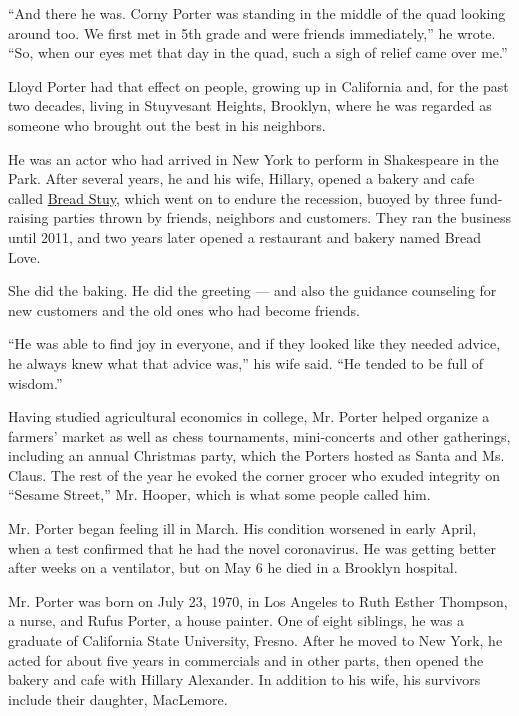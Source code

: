 ``And there he was. Corny Porter was standing in the middle of the quad
looking around too. We first met in 5th grade and were friends
immediately,'' he wrote. ``So, when our eyes met that day in the quad,
such a sigh of relief came over me.''

Lloyd Porter had that effect on people, growing up in California and,
for the past two decades, living in Stuyvesant Heights, Brooklyn, where
he was regarded as someone who brought out the best in his neighbors.

He was an actor who had arrived in New York to perform in Shakespeare in
the Park. After several years, he and his wife, Hillary, opened a bakery
and cafe called
\href{https://www.nytimes3xbfgragh.onion/2010/02/13/nyregion/13metjournal.html}{Bread
Stuy}, which went on to endure the recession, buoyed by three
fund-raising parties thrown by friends, neighbors and customers. They
ran the business until 2011, and two years later opened a restaurant and
bakery named Bread Love.

She did the baking. He did the greeting --- and also the guidance
counseling for new customers and the old ones who had become friends.

``He was able to find joy in everyone, and if they looked like they
needed advice, he always knew what that advice was,'' his wife said.
``He tended to be full of wisdom.''

Having studied agricultural economics in college, Mr. Porter helped
organize a farmers' market as well as chess tournaments, mini-concerts
and other gatherings, including an annual Christmas party, which the
Porters hosted as Santa and Ms. Claus. The rest of the year he evoked
the corner grocer who exuded integrity on ``Sesame Street,'' Mr. Hooper,
which is what some people called him.

Mr. Porter began feeling ill in March. His condition worsened in early
April, when a test confirmed that he had the novel coronavirus. He was
getting better after weeks on a ventilator, but on May 6 he died in a
Brooklyn hospital.

Mr. Porter was born on July 23, 1970, in Los Angeles to Ruth Esther
Thompson, a nurse, and Rufus Porter, a house painter. One of eight
siblings, he was a graduate of California State University, Fresno.
After he moved to New York, he acted for about five years in commercials
and in other parts, then opened the bakery and cafe with Hillary
Alexander. In addition to his wife, his survivors include their
daughter, MacLemore.

